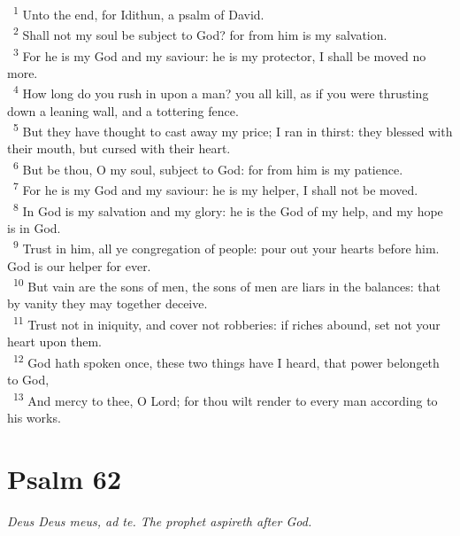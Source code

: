 \documentclass[a5paper,12pt]{article}
\begin{document}
\begin{multicols*}{2}
~\textsuperscript{1} Unto the end, for Idithun, a psalm of David.\\
~\textsuperscript{2} Shall not my soul be subject to God? for from him is my salvation.\\
~\textsuperscript{3} For he is my God and my saviour: he is my protector, I shall be moved no more.\\
~\textsuperscript{4} How long do you rush in upon a man? you all kill, as if you were thrusting down a leaning wall, and a tottering fence.\\
~\textsuperscript{5} But they have thought to cast away my price; I ran in thirst: they blessed with their mouth, but cursed with their heart.\\
~\textsuperscript{6} But be thou, O my soul, subject to God: for from him is my patience.\\
~\textsuperscript{7} For he is my God and my saviour: he is my helper, I shall not be moved.\\
~\textsuperscript{8} In God is my salvation and my glory: he is the God of my help, and my hope is in God.\\
~\textsuperscript{9} Trust in him, all ye congregation of people: pour out your hearts before him. God is our helper for ever.\\
~\textsuperscript{10} But vain are the sons of men, the sons of men are liars in the balances: that by vanity they may together deceive.\\
~\textsuperscript{11} Trust not in iniquity, and cover not robberies: if riches abound, set not your heart upon them.\\
~\textsuperscript{12} God hath spoken once, these two things have I heard, that power belongeth to God,\\
~\textsuperscript{13} And mercy to thee, O Lord; for thou wilt render to every man according to his works.\\

\section{Psalm 62}
\label{sec:orga0c3e33}
\emph{Deus Deus meus, ad te. The prophet aspireth after God.}\\


\end{multicols*}
\end{document}
